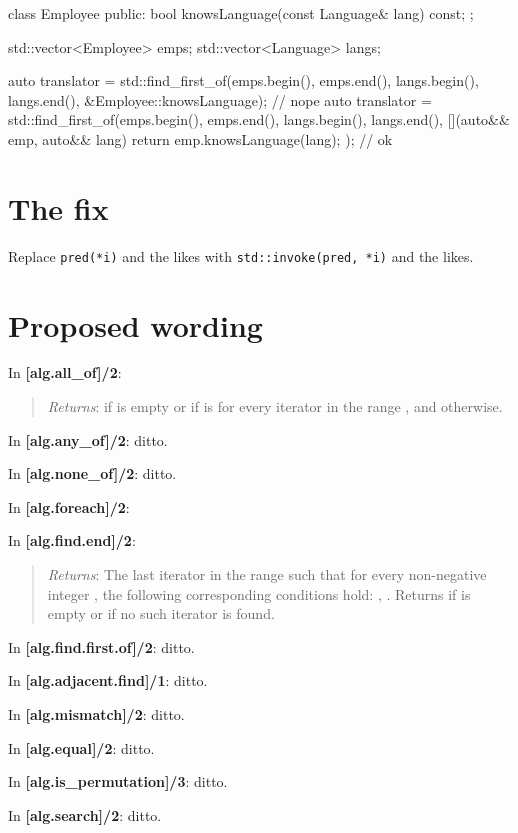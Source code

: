 \documentclass{wg21}
\newcommand{\cc}[1]{\texttt{#1}}
\begin{document}
\begin{cpp}
  class Employee
  {
  public:
      bool knowsLanguage(const Language& lang) const;
  };

  std::vector<Employee> emps;
  std::vector<Language> langs;

  auto translator = std::find_first_of(emps.begin(), emps.end(),
          langs.begin(), langs.end(),
          &Employee::knowsLanguage);                            // nope
  auto translator = std::find_first_of(emps.begin(), emps.end(),
          langs.begin(), langs.end(),
          [](auto&& emp, auto&& lang) { return emp.knowsLanguage(lang); });
                                                                // ok
\end{cpp}

\section{The fix}

Replace \cc{pred(*i)} and the likes with \cc{std::invoke(pred, *i)}
and the likes.

\section{Proposed wording}

In \textbf{[alg.all_of]/2}:
\begin{quote}
  \emph{Returns}:  if \tcode{[first, last)} is empty or if
    is
   for every iterator  in the range \tcode{[first, last)},
  and  otherwise.
\end{quote}

In \textbf{[alg.any_of]/2}: ditto.

In \textbf{[alg.none_of]/2}: ditto.

In \textbf{[alg.foreach]/2}:
\begin{quote}
\end{quote}

In \textbf{[alg.find.end]/2}:
\begin{quote}
  \emph{Returns}: The last iterator  in the range
  \tcode{[first1, last1 - (last2 - first2))} such that for every non-negative
  integer , the following corresponding conditions
  hold: ,
  .
  Returns  if \tcode{[first2, last2)} is empty or if no such iterator is found.
\end{quote}

In \textbf{[alg.find.first.of]/2}: ditto.

In \textbf{[alg.adjacent.find]/1}: ditto.

In \textbf{[alg.mismatch]/2}: ditto.

In \textbf{[alg.equal]/2}: ditto.

In \textbf{[alg.is_permutation]/3}: ditto.

In \textbf{[alg.search]/2}: ditto.
\end{document}
